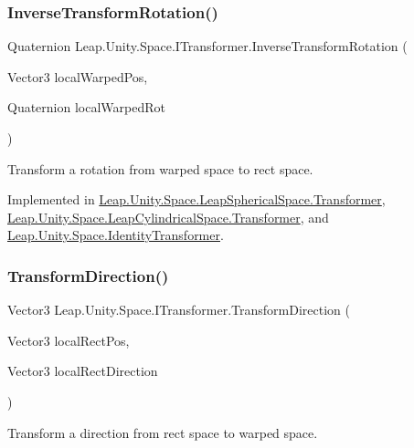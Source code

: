 \subsubsection{\texorpdfstring{InverseTransformRotation()}{InverseTransformRotation()}}
{\footnotesize\ttfamily Quaternion Leap.\+Unity.\+Space.\+I\+Transformer.\+Inverse\+Transform\+Rotation (\begin{DoxyParamCaption}\item[{Vector3}]{local\+Warped\+Pos,  }\item[{Quaternion}]{local\+Warped\+Rot }\end{DoxyParamCaption})}



Transform a rotation from warped space to rect space. 



Implemented in \mbox{\hyperlink{class_leap_1_1_unity_1_1_space_1_1_leap_spherical_space_1_1_transformer_a00568c8a27881e7d49f850eec0ba562e}{Leap.\+Unity.\+Space.\+Leap\+Spherical\+Space.\+Transformer}}, \mbox{\hyperlink{class_leap_1_1_unity_1_1_space_1_1_leap_cylindrical_space_1_1_transformer_a679c3020469b4b124056bd8f83c99c26}{Leap.\+Unity.\+Space.\+Leap\+Cylindrical\+Space.\+Transformer}}, and \mbox{\hyperlink{class_leap_1_1_unity_1_1_space_1_1_identity_transformer_acd239c878d3c9edba001ed51f4511c1a}{Leap.\+Unity.\+Space.\+Identity\+Transformer}}.

\mbox{\label{interface_leap_1_1_unity_1_1_space_1_1_i_transformer_a86883dfa18d51d4254dff56b1d9f5024}} 
\subsubsection{\texorpdfstring{TransformDirection()}{TransformDirection()}}
{\footnotesize\ttfamily Vector3 Leap.\+Unity.\+Space.\+I\+Transformer.\+Transform\+Direction (\begin{DoxyParamCaption}\item[{Vector3}]{local\+Rect\+Pos,  }\item[{Vector3}]{local\+Rect\+Direction }\end{DoxyParamCaption})}



Transform a direction from rect space to warped space. 



